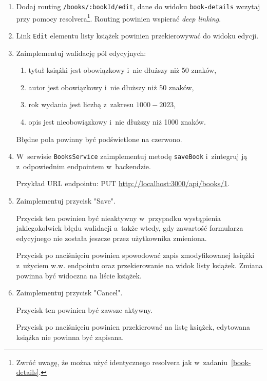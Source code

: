 \documentclass[12pt]{article}
\begin{document}
\begin{enumerate}
			\begin{enumerate}
				\item Dodaj routing \texttt{/books/:bookId/edit}, dane do widoku \texttt{book-details} wczytaj przy pomocy resolvera\footnote{Zwróć uwagę, że można użyć identycznego resolvera jak w~zadaniu~\ref{book-details}.}.
				Routing powinien wspierać \emph{deep linking}.

				\item Link \texttt{Edit} elementu listy książek powinien przekierowywać do widoku edycji.

				\item Zaimplementuj walidację pól edycyjnych:
				\begin{enumerate}
					\item tytuł książki jest obowiązkowy i~nie dłuższy niż 50 znaków,
					\item autor jest obowiązkowy i~nie dłuższy niż 50 znaków,
					\item rok wydania jest liczbą z~zakresu $1000-2023$,
					\item opis jest nieobowiązkowy i~nie dłuższy niż 1000 znaków.
				\end{enumerate}
				Błędne pola powinny być podświetlone na czerwono.

				\item W~serwisie \texttt{BooksService} zaimplementuj metodę \texttt{saveBook} i~zintegruj ją z~odpowiednim endpointem w~backendzie.

				Przykład URL endpointu: PUT \href{http://localhost:3000/api/books/1}{http://localhost:3000/api/books/1}.

				\item Zaimplementuj przycisk "Save".

				Przycisk ten powinien być nieaktywny w~przypadku wystąpienia jakiegokolwiek błędu walidacji a~także wtedy, gdy zawartość formularza edycyjnego nie została jeszcze przez użytkownika zmieniona.

				Przycisk po naciśnięciu powinien spowodować zapis zmodyfikowanej książki z~użyciem w.w. endpointu oraz przekierowanie na widok listy książek.
				Zmiana powinna być widoczna na liście książek.

				\item Zaimplementuj przycisk "Cancel".

				Przycisk ten powinien być zawsze aktywny.

				Przycisk po naciśnięciu powinien przekierować na listę książek, edytowana książka nie powinna być zapisana.
			\end{enumerate}


\end{enumerate}
\end{document}
